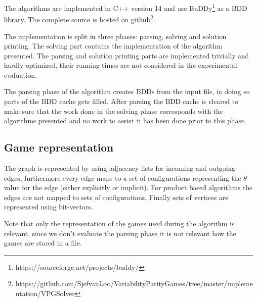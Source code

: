 The algorithms are implemented in C++ version 14 and use BuDDy\footnote{\label{note1}https://sourceforge.net/projects/buddy/} as a BDD library. The complete source is hosted on github\footnote{\label{note2}https://github.com/SjefvanLoo/VariabilityParityGames/tree/master/implementation/VPGSolver}.

The implementation is split in three phases: parsing, solving and solution printing. The solving part contains the implementation of the algorithm presented. The parsing and solution printing parts are implemented trivially and hardly optimized, their running times are not considered in the experimental evaluation.

The parsing phase of the algorithm creates BDDs from the input file, in doing so parts of the BDD cache gets filled. After parsing the BDD cache is cleared to make sure that the work done in the solving phase corresponds with the algorithms presented and no work to assist it has been done prior to this phase.

\subsection{Game representation}
The graph is represented by using adjacency lists for incoming and outgoing edges, furthermore every edge maps to a set of configurations representing the $\theta$ value for the edge (either explicitly or implicit). For product based algorithms the edges are not mapped to sets of configurations. Finally sets of vertices are represented using bit-vectors.

Note that only the representation of the games used during the algorithm is relevant, since we don't evaluate the parsing phase it is not relevant how the games are stored in a file.
